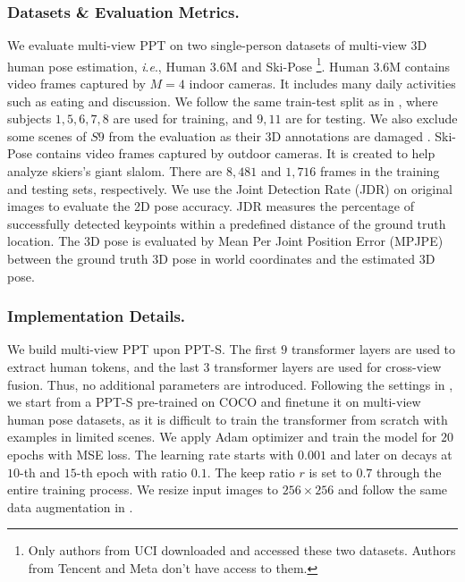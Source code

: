 \documentclass[runningheads]{llncs}
\newcommand{\ie}{\textit{i}.\textit{e}., }
\begin{document}
\subsubsection{Datasets \& Evaluation Metrics.} 
We evaluate multi-view PPT on two single-person datasets of multi-view 3D human pose estimation, \ie Human 3.6M \cite{h36m_pami,IonescuSminchisescu11} and Ski-Pose \cite{sporri2016reasearch,fasel2017joint} \footnote{Only authors from UCI downloaded and accessed these two datasets. Authors from Tencent and Meta don't have access to them. }. 
Human 3.6M contains video frames captured by $M=4$ indoor cameras. 
It includes many daily activities such as eating and discussion. We follow the same train-test split as in \cite{qiu2019cross,iskakov2019learnable,he2020epipolar}, where subjects $1, 5, 6, 7, 8$ are used for training, and $9, 11$ are for testing. 
We also exclude some scenes of  $S9$ from the evaluation as their 3D annotations are damaged \cite{iskakov2019learnable}. 
Ski-Pose contains video frames captured by outdoor cameras. It is created to help analyze skiers's giant slalom. There are $8,481$ and $1,716$ frames in the training and testing sets, respectively. 
We use the Joint Detection Rate (JDR) on original images \cite{qiu2019cross} to evaluate the 2D pose accuracy. 
JDR measures the percentage of successfully detected keypoints within a predefined distance of the ground truth location. 
The 3D pose is evaluated by Mean Per Joint Position Error (MPJPE) between the ground truth 3D pose in world coordinates and the estimated 3D pose. 





\subsubsection{Implementation Details. } 
We build multi-view PPT upon PPT-S. The first $9$ transformer layers are used to extract human tokens, and the last $3$ transformer layers are used for cross-view fusion. Thus, no additional parameters are introduced. 
Following the settings in \cite{he2020epipolar,ma2021transfusion}, we start from a PPT-S pre-trained on COCO and finetune it on multi-view human pose datasets, as it is difficult to train the transformer from scratch with examples in limited scenes. 
We apply Adam optimizer and train the model for $20$ epochs with MSE loss. The learning rate starts with $0.001$ and later on decays at $10$-th and $15$-th epoch with ratio $0.1$. The keep ratio $r$ is set to $0.7$ through the entire training process. 
We resize input images to $256\times256$ and follow the same data augmentation in \cite{qiu2019cross,ma2021transfusion}. 
\end{document}
